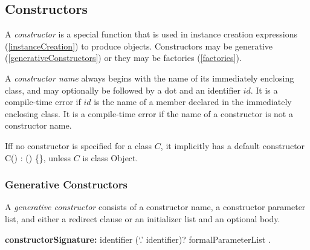 \documentclass{article}
\newcommand{\code}[1]{{\sf #1}}
\begin{document}


\subsection{Constructors}

\LMHash{}
A {\em constructor} is a special function that is used in instance creation expressions (\ref{instanceCreation}) to produce objects. Constructors may be generative (\ref{generativeConstructors}) or they may be factories (\ref{factories}). 

\LMHash{}
A {\em constructor name} always begins with the name of its immediately enclosing class, and may optionally be followed by a dot and an identifier $id$. It is a compile-time error if $id$ is the name of a member  declared in the immediately enclosing class. It is a compile-time error if the name of a  constructor is not a constructor name. 




\LMHash{}
Iff no constructor is specified for a class $C$, it implicitly has a default constructor \code{C() : \SUPER{}() \{\}}, unless $C$ is class \code{Object}.

\subsubsection{Generative Constructors}

\LMHash{}
A {\em generative constructor} consists of a constructor name, a constructor parameter list, and either a redirect clause or an  initializer list and an optional body.

\begin{grammar}
{\bf constructorSignature:}
      identifier (`{\escapegrammar .}' identifier)? formalParameterList
    .
 \end{grammar}
\end{document}
